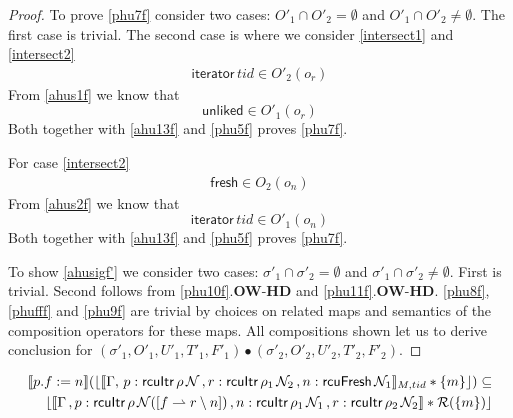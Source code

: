 \begin{proof}
To prove \ref{phu7f} consider two cases: $O'_1 \cap O'_2 = \emptyset$ and $O'_1 \cap O'_2 \neq \emptyset$. The first case is trivial. The second case is where we consider \ref{intersect1} and \ref{intersect2}
\begin{gather}\label{intersect1}
\textsf{iterator}\,tid \in O'_2(o_r)
\end{gather}
From \ref{ahus1f} we know that
\[\textsf{unliked} \in O'_1(o_r)\]
Both together with \ref{ahu13f} and \ref{phu5f} proves \ref{phu7f}.

For case \ref{intersect2}
\begin{gather}\label{intersect2}
\textsf{fresh} \in O_2(o_n)
\end{gather}
From \ref{ahus2f} we know that
\[\textsf{iterator}\, tid \in O'_1(o_n)\]
Both together with \ref{ahu13f} and \ref{phu5f} proves \ref{phu7f}.

To show \ref{ahusigf'} we consider two cases: $\sigma'_1 \cap \sigma'_2 = \emptyset$ and $\sigma'_1 \cap \sigma'_2 \neq \emptyset$. First is trivial. Second follows from \ref{phu10f}.\textbf{OW}-\textbf{HD} and \ref{phu11f}.\textbf{OW}-\textbf{HD}. \ref{phu8f}, \ref{phufff} and \ref{phu9f} are trivial by choices on related maps and semantics of the composition operators for these maps. All compositions shown  let us to derive conclusion for $(\sigma'_1, O'_1, U'_1, T'_1,F'_1) \bullet (\sigma'_2, O'_2, U'_2, T'_2,F'_2) $.
 \end{proof}
 \begin{lemma}
   \label{lemma:linkflk}
   \begin{align*}
  \llbracket p.f := n \rrbracket (\lfloor \llbracket \Gamma,\,
 p:\textsf{rcuItr}\, \rho \, \mathcal{N} \, ,
  r:\textsf{rcuItr}\, \rho_1 \, \mathcal{N}_2 \, , n:\textsf{rcuFresh} \, \mathcal{N}_1 \rrbracket_{M,tid} * \{m\}\rfloor)  \subseteq \\
  \lfloor \llbracket \Gamma \,,p:\textsf{rcuItr}\, \rho \, \mathcal{N}([f \rightharpoonup r \setminus  n]) \, , n:\textsf{rcuItr}\, \rho_1 \, \mathcal{N}_1 \, ,r:\textsf{rcuItr}\,\rho_2\,\mathcal{N}_2 \rrbracket  * \mathcal{R}(\{m\})\rfloor
\end{align*}
 \end{lemma}

